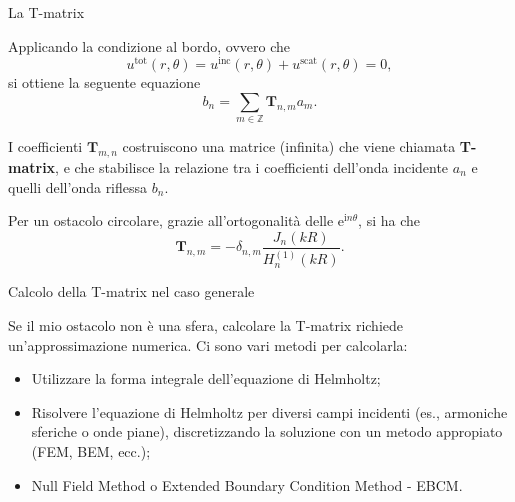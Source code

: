 \documentclass{beamer}
\newcommand{\IZ}{{\mathbb Z}}
\newcommand{\inc}{{\mathrm{inc}}}
\newcommand{\tot}{{\mathrm{tot}}}
\newcommand{\scat}{{\mathrm{scat}}}
\newcommand{\ri}{{\mathrm i}}
\newcommand{\re}{{\mathrm e}}
\begin{document}
	\begin{frame}{La T-matrix}
		\begin{small}
			Applicando la condizione al bordo, ovvero che
		\begin{equation*}
			u^\tot(r,\theta)=u^\inc(r,\theta)+u^\scat(r,\theta)=0,
		\end{equation*}
		si ottiene la seguente equazione
		\begin{equation*}
			b_n = \sum_{m \in \IZ} \mathbf{T}_{n,m} a_m.
		\end{equation*}
		\begin{block}{}
			I coefficienti $\mathbf{T}_{m,n}$ costruiscono una matrice (infinita) che viene chiamata \textbf{T-matrix}, e che stabilisce la relazione tra i coefficienti dell'onda incidente $a_n$ e quelli dell'onda riflessa $b_n$. 
		\end{block}
		
		Per un ostacolo circolare, grazie all'ortogonalità delle $\re^{\ri n\theta}$, si ha che 
		\begin{equation*}
			\mathbf{T}_{n,m} = -\delta_{n,m} \frac{J_n(kR)}{H_n^{(1)}(kR)}.
		\end{equation*}
		\end{small}
	\end{frame}
	
	\begin{frame}{Calcolo della T-matrix nel caso generale}
		\begin{block}{}
			Se il mio ostacolo non è una sfera, calcolare la T-matrix richiede un'approssimazione numerica. Ci sono vari metodi per calcolarla:
			\begin{itemize}
				\item Utilizzare la forma integrale dell'equazione di Helmholtz;
				\item Risolvere l'equazione di Helmholtz per diversi campi incidenti (es., armoniche sferiche o onde piane), discretizzando la soluzione con un metodo appropiato (FEM, BEM, ecc.);
				\item Null Field Method o Extended Boundary Condition Method - EBCM.
			\end{itemize}
		\end{block}
	\end{frame}
	
\end{document}
